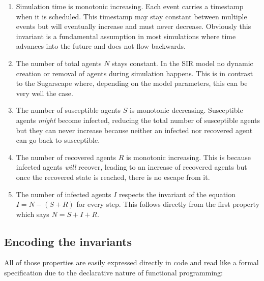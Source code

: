 \begin{enumerate}
	\item Simulation time is monotonic increasing. %
	Each event carries a timestamp when it is scheduled. This timestamp may stay constant between multiple events but will eventually increase and must never decrease. Obviously this invariant is a fundamental assumption in most simulations where time advances into the future and does not flow backwards.
	
	\item The number of total agents $N$ stays constant. In the SIR model no dynamic creation or removal of agents during simulation happens. This is in contrast to the Sugarscape where, depending on the model parameters, this can be very well the case.
	
	\item The number of susceptible agents $S$ is monotonic decreasing. Susceptible agents \textit{might} become infected, reducing the total number of susceptible agents but they can never increase because neither an infected nor recovered agent can go back to susceptible.
	
	\item The number of recovered agents $R$ is monotonic increasing. This is because infected agents \textit{will} recover, leading to an increase of recovered agents but once the recovered state is reached, there is no escape from it.
	
	\item The number of infected agents $I$ respects the invariant of the equation $I = N - (S + R)$ for every step. This follows directly from the first property which says $N = S + I + R$.
\end{enumerate}

\subsection{Encoding the invariants}
All of those properties are easily expressed directly in code and read like a formal specification due to the declarative nature of functional programming:

